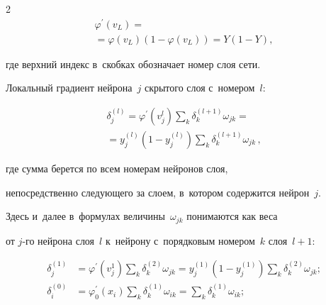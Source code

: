 \begin{multicols}{2}
\begin{multline}
\varphi^{'}(v_L)={}\\


{}=\varphi(v_L)(1-\varphi(v_L))= Y(1-Y),


\end{multline}


где верхний индекс в~скобках обозначает номер слоя сети.


Локальный градиент  нейрона~$j$ скрытого слоя с~номером~$l$:


\begin{multline}


\label{Del2}


\delta_j^{(l)}=\varphi^\prime


\left(v_j^l\right)\sum\limits_{k} \delta_k^{(l+1)} 


\omega_{jk}={}\\


{}=y_j^{(l)}\left(1-y_j^{(l)}\right)


\sum\limits_{k} \delta_k^{(l+1)} \omega_{jk}\,,


\end{multline}


где сумма берется по всем номерам нейронов слоя, 


непосредственно следующего за слоем, в~котором содержится нейрон~$j$. 


Здесь и~далее в~формулах величины~$\omega_{jk}$ понимаются как веса 


от $j$-го нейрона слоя~$l$ к~нейрону с~порядковым номером~$k$ слоя~$l+1$:


\begin{align*}




\delta_j^{(1)}&=\varphi^\prime\left( 


v_j^1 \right)\sum\limits_{k} \!\delta_k^{(2)} \omega_{jk} = 


y_j^{(1)}\left(1-y_j^{(1)}\right)\sum\limits_{k}\! \delta_k^{(2)} \omega_{jk};


\\




\delta_i^{(0)}&=\varphi_0^\prime ( x_i )\sum\limits_{k} \!


\delta_k^{(1)} \omega_{ik}=\sum\limits_{k} \!\delta_k^{(1)} \omega_{ik};


\end{align*}





\vspace*{-12pt}



\end{multicols}
